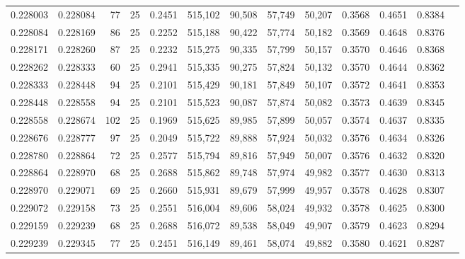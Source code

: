 \begin{tabular}{rrrrrrrrrrrrr}
0.228003 & 0.228084 &    77 &  25 &                                     0.2451 & 515,102 &  90,508 &  57,749 &  50,207 & 0.3568 & 0.4651 & 0.8384 \\
0.228084 & 0.228169 &    86 &  25 &                                     0.2252 & 515,188 &  90,422 &  57,774 &  50,182 & 0.3569 & 0.4648 & 0.8376 \\
0.228171 & 0.228260 &    87 &  25 &                                     0.2232 & 515,275 &  90,335 &  57,799 &  50,157 & 0.3570 & 0.4646 & 0.8368 \\
0.228262 & 0.228333 &    60 &  25 &                                     0.2941 & 515,335 &  90,275 &  57,824 &  50,132 & 0.3570 & 0.4644 & 0.8362 \\
0.228333 & 0.228448 &    94 &  25 &                                     0.2101 & 515,429 &  90,181 &  57,849 &  50,107 & 0.3572 & 0.4641 & 0.8353 \\
0.228448 & 0.228558 &    94 &  25 &                                     0.2101 & 515,523 &  90,087 &  57,874 &  50,082 & 0.3573 & 0.4639 & 0.8345 \\
0.228558 & 0.228674 &   102 &  25 &                                     0.1969 & 515,625 &  89,985 &  57,899 &  50,057 & 0.3574 & 0.4637 & 0.8335 \\
0.228676 & 0.228777 &    97 &  25 &                                     0.2049 & 515,722 &  89,888 &  57,924 &  50,032 & 0.3576 & 0.4634 & 0.8326 \\
0.228780 & 0.228864 &    72 &  25 &                                     0.2577 & 515,794 &  89,816 &  57,949 &  50,007 & 0.3576 & 0.4632 & 0.8320 \\
0.228864 & 0.228970 &    68 &  25 &                                     0.2688 & 515,862 &  89,748 &  57,974 &  49,982 & 0.3577 & 0.4630 & 0.8313 \\
0.228970 & 0.229071 &    69 &  25 &                                     0.2660 & 515,931 &  89,679 &  57,999 &  49,957 & 0.3578 & 0.4628 & 0.8307 \\
0.229072 & 0.229158 &    73 &  25 &                                     0.2551 & 516,004 &  89,606 &  58,024 &  49,932 & 0.3578 & 0.4625 & 0.8300 \\
0.229159 & 0.229239 &    68 &  25 &                                     0.2688 & 516,072 &  89,538 &  58,049 &  49,907 & 0.3579 & 0.4623 & 0.8294 \\
0.229239 & 0.229345 &    77 &  25 &                                     0.2451 & 516,149 &  89,461 &  58,074 &  49,882 & 0.3580 & 0.4621 & 0.8287 \\

\end{tabular}
